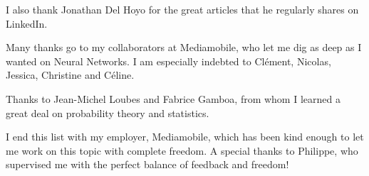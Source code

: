 I also thank Jonathan Del Hoyo for the great articles that he regularly shares on LinkedIn.

\vspace{0.2cm}

Many thanks go to my collaborators at Mediamobile, who let me dig as deep as I wanted on Neural Networks. I am especially indebted to Clément, Nicolas, Jessica, Christine and Céline.

\vspace{0.2cm}

Thanks to Jean-Michel Loubes and Fabrice Gamboa, from whom I learned a great deal on probability theory and statistics.

\vspace{0.2cm}

I end this list with my employer, Mediamobile, which has been kind enough to let me work on this topic with complete freedom. A special thanks to Philippe, who supervised me with the perfect balance of feedback and freedom!

